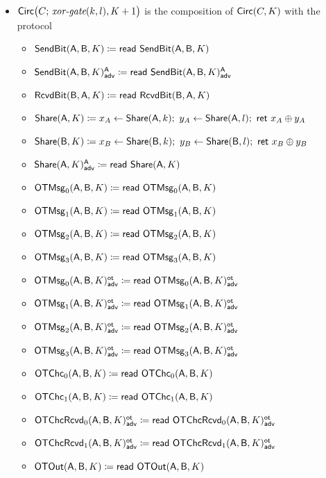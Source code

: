 \begin{itemize}
\item $\Circ\big(C; \, \xorgate(k,l),K+1\big)$ is the composition of $\Circ(C,K)$ with the protocol
\begin{itemize}
\item $\SendBit(\A,\B,K) \coloneqq \read{\SendBit(\A,\B,K)}$
\item {\color{blue} $\LeakSendBit(\A,\B,K)^\A_\adv \coloneqq \read{\LeakSendBit(\A,\B,K)^\A_\adv}$}\smallskip
\item $\RcvdBit(\B,\A,K) \coloneqq \read{\RcvdBit(\B,\A,K)}$\smallskip
\item $\Share(\A,K) \coloneqq x_A \leftarrow \Share(\A,k); \ y_A \leftarrow \Share(\A,l); \ \ret{x_A \oplus y_A}$
\item $\Share(\B,K) \coloneqq x_B \leftarrow \Share(\B,k); \ y_B \leftarrow \Share(\B,l); \ \ret{x_B \oplus y_B}$
\item {\color{blue} $\LeakShare(\A,K)^\A_\adv \coloneqq \read{\Share(\A,K)}$}\smallskip
\item $\OTMsg_0(\A,\B,K) \coloneqq \read{\OTMsg_0(\A,\B,K)}$
\item $\OTMsg_1(\A,\B,K) \coloneqq \read{\OTMsg_1(\A,\B,K)}$
\item $\OTMsg_2(\A,\B,K) \coloneqq \read{\OTMsg_2(\A,\B,K)}$
\item $\OTMsg_3(\A,\B,K) \coloneqq \read{\OTMsg_3(\A,\B,K)}$\smallskip
\item {\color{blue} $\LeakOTMsg_0(\A,\B,K)^\ot_\adv \coloneqq \read{\LeakOTMsg_0(\A,\B,K)^\ot_\adv}$}
\item {\color{blue} $\LeakOTMsg_1(\A,\B,K)^\ot_\adv \coloneqq \read{\LeakOTMsg_1(\A,\B,K)^\ot_\adv}$}
\item {\color{blue} $\LeakOTMsg_2(\A,\B,K)^\ot_\adv \coloneqq \read{\LeakOTMsg_2(\A,\B,K)^\ot_\adv}$}
\item {\color{blue} $\LeakOTMsg_3(\A,\B,K)^\ot_\adv \coloneqq \read{\LeakOTMsg_3(\A,\B,K)^\ot_\adv}$}\smallskip
\item $\OTChc_0(\A,\B,K) \coloneqq \read{\OTChc_0(\A,\B,K)}$
\item $\OTChc_1(\A,\B,K) \coloneqq \read{\OTChc_1(\A,\B,K)}$\smallskip
\item {\color{blue} $\LeakOTChcRcvd_0(\A,\B,K)^\ot_\adv \coloneqq \read{\LeakOTChcRcvd_0(\A,\B,K)^\ot_\adv}$}
\item {\color{blue} $\LeakOTChcRcvd_1(\A,\B,K)^\ot_\adv \coloneqq \read{\LeakOTChcRcvd_1(\A,\B,K)^\ot_\adv}$}\smallskip
\item $\OTOut(\A,\B,K) \coloneqq \read{\OTOut(\A,\B,K)}$
\end{itemize}


\end{itemize}
